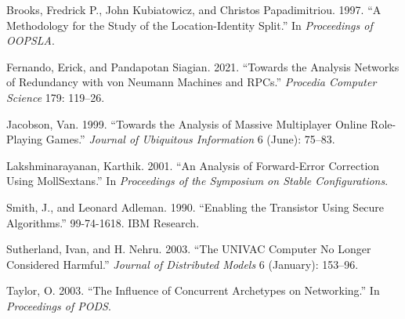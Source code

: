 \documentclass[
  letterpaper,
  DIV=11,
  numbers=noendperiod]{scrartcl}
\newlength{\cslhangindent}
\newenvironment{CSLReferences}[2] %
 {\begin{list}{}{%
  \setlength{\itemindent}{0pt}
  \setlength{\leftmargin}{0pt}
  \setlength{\parsep}{0pt}
  \ifodd #1
   \setlength{\leftmargin}{\cslhangindent}
   \setlength{\itemindent}{-1\cslhangindent}
  \fi
  \setlength{\itemsep}{#2\baselineskip}}}
 {\end{list}}
\begin{document}
\label{refs}
\begin{CSLReferences}{1}{0}
Brooks, Fredrick P., John Kubiatowicz, and Christos Papadimitriou. 1997.
{``A Methodology for the Study of the Location-Identity Split.''} In
\emph{Proceedings of OOPSLA}.

Fernando, Erick, and Pandapotan Siagian. 2021. {``Towards the Analysis
Networks of Redundancy with von Neumann Machines and RPCs.''}
\emph{Procedia Computer Science} 179: 119--26.

Jacobson, Van. 1999. {``Towards the Analysis of Massive Multiplayer
Online Role-Playing Games.''} \emph{Journal of Ubiquitous Information} 6
(June): 75--83.

Lakshminarayanan, Karthik. 2001. {``An Analysis of Forward-Error
Correction Using {MollSextans}.''} In \emph{{Proceedings} of the
{Symposium} on Stable Configurations}.

Smith, J., and Leonard Adleman. 1990. {``Enabling the Transistor Using
Secure Algorithms.''} 99-74-1618. {IBM} {Research}.

Sutherland, Ivan, and H. Nehru. 2003. {``The {UNIVAC} Computer No Longer
Considered Harmful.''} \emph{{Journal} of Distributed Models} 6
(January): 153--96.

Taylor, O. 2003. {``The Influence of Concurrent Archetypes on
Networking.''} In \emph{{Proceedings} of {PODS}}.

\end{CSLReferences}
\end{document}
